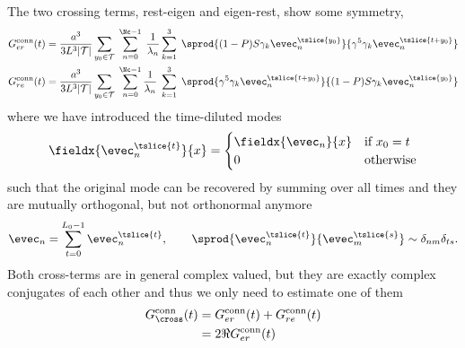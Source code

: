 The two crossing terms, rest-eigen and eigen-rest, show some symmetry,
\begin{align}
G_{er}^{\text{conn}}(t) &=
\frac{a^{3}}{3 L^{3} \lvert \mathcal{T} \rvert}
\sum_{y_0 \in \mathcal{T}} \;
\sum_{n=0}^{\Nc-1} \; \frac{1}{\lambda_{n}}
\sum_{k=1}^{3} \;
\sprod{
  (1-P) S
  \gamma_k
  \evec_{n}^{\tslice{y_0}}
}{
  \gamma^{5}
  \gamma_k
  \evec_{n}^{\tslice{t+y_0}}
} \\
G_{re}^{\text{conn}}(t) &=
\frac{a^{3}}{3 L^{3} \lvert \mathcal{T} \rvert}
\sum_{y_0 \in \mathcal{T}} \;
\sum_{n=0}^{\Nc-1} \frac{1}{\lambda_{n}} \;
\sum_{k=1}^{3} \;
\sprod{
  \gamma^{5}
  \gamma_k
  \evec_{n}^{\tslice{t+y_0}}
}{
  (1-P) S
  \gamma_k
  \evec_{n}^{\tslice{y_0}}
}
\end{align}
where we have introduced the time-diluted modes
\begin{equation}
\fieldx{\evec_{n}^{\tslice{t}}}{x} =
\begin{cases}
  \fieldx{\evec_{n}}{x} & \text{if } x_0 = t \\
  0 & \text{otherwise}
\end{cases} 
\end{equation}
such that the original mode can be recovered by summing over all times and they are mutually orthogonal, but not orthonormal anymore
\begin{equation}
\evec_{n} = \sum_{t=0}^{L_0-1} \evec_{n}^{\tslice{t}},
\qquad
\sprod{\evec_{n}^{\tslice{t}}}{\evec_{m}^{\tslice{s}}} \sim \delta_{nm} \delta_{ts}.
\end{equation}
Both cross-terms are in general complex valued, but they are exactly complex conjugates of each other and thus we only need to estimate one of them
\begin{align}
G_{\cross}^{\text{conn}}(t)
&= G_{er}^{\text{conn}}(t) + G_{re}^{\text{conn}}(t) \\
&= 2 \Re{G_{er}^{\text{conn}}(t)}
\end{align}

